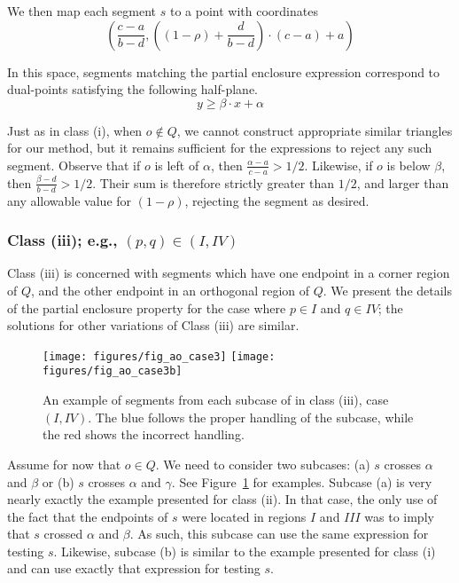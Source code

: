 \noindent We then map each segment $s$ to a point with coordinates
\[
\left (\frac{c-a}{b-d}, \left ( (1 - \rho) + \frac{d}{b-d} \right ) \cdot (c-a) + a \right )
\]

\noindent In this space, segments matching the partial enclosure expression correspond to dual-points satisfying the following half-plane.
\[
y \geq \beta \cdot x + \alpha
\]

Just as in class (i), when $o \not \in Q$, we cannot construct appropriate similar triangles for our method, but it remains sufficient for the expressions to reject any such segment. Observe that if $o$ is left of $\alpha$, then $\frac{\alpha - a}{c - a} > 1/2$. Likewise, if $o$ is below $\beta$, then $\frac{\beta - d}{b - d} > 1/2$. Their sum is therefore strictly greater than $1/2$, and larger than any allowable value for $(1 - \rho)$, rejecting the segment as desired.


\subsubsection{Class (iii); e.g., $(p, q) \in (I, IV)$}
\label{:rectanges:ao:class3}

Class (iii) is concerned with segments which have one endpoint in a corner region of $Q$, and the other endpoint in an orthogonal region of $Q$. 
We present the details of the partial enclosure property for the case where $p \in I$ and $q \in IV$; the solutions for other variations of Class (iii) are similar.

\begin{figure}[t]
\begin{center}
  \texttt{[image: figures/fig\_ao\_case3]}
  \hspace{1.0em}
  \texttt{[image: figures/fig\_ao\_case3b]}
  \caption[An example of a segment in class (iii), case $(I, IV)$.]{An example of segments from each subcase of in class (iii), case $(I, IV)$. The blue follows the proper handling of the subcase, while the red shows the incorrect handling.}
  \label{fig:rectangles:ao:case3}
\end{center}
\end{figure}

Assume for now that $o \in Q$. We need to consider two subcases: (a) $s$ crosses $\alpha$ and $\beta$ or (b) $s$ crosses $\alpha$ and $\gamma$. See Figure~\ref{fig:rectangles:ao:case3} for examples. Subcase (a) is very nearly exactly the example presented for class (ii). In that case, the only use of the fact that the endpoints of $s$ were located in regions $I$ and $III$ was to imply that $s$ crossed $\alpha$ and $\beta$. As such, this subcase can use the same expression for testing $s$. Likewise, subcase (b) is similar to the example presented for class (i) and can use exactly that expression for testing $s$.

